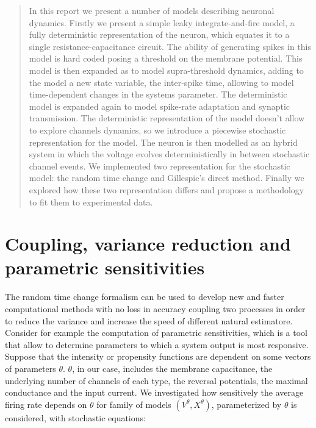\begin{abstract}
	In this report we present a number of models describing neuronal dynamics.
	Firstly we present a simple leaky integrate-and-fire model, a fully deterministic representation of the neuron, which equates it to a single resistance-capacitance circuit.
	The ability of generating spikes in this model is hard coded posing a threshold on the membrane potential.
	This model is then expanded as to model supra-threshold dynamics, adding to the model a new state variable, the inter-spike time, allowing to model time-dependent changes in the systems parameter.
	The deterministic model is expanded again to model spike-rate adaptation and synaptic transmission.
	The deterministic representation of the model doesn't allow to explore channels dynamics, so we introduce a piecewise stochastic representation for the model.
	The neuron is then modelled as an hybrid system in which the voltage evolves deterministically in between stochastic channel events.
	We implemented two representation for the stochastic model: the random time change and Gillespie's direct method.
	Finally we explored how these two representation differs and propose a methodology to fit them to experimental data.
\end{abstract}












\section{Coupling, variance reduction and parametric sensitivities}
The random time change formalism can be used to develop new and faster computational methods with no loss in accuracy coupling two processes in order to reduce the variance and increase the speed of different natural estimatore.
Consider for example the computation of parametric sensitivities, which is a tool that allow to determine parameters to which a system output is most responsive.
Suppose that the intensity or propensity functions are dependent on some vectors of parameters $\theta$.
$\theta$, in our case, includes the membrane capacitance, the underlying number of channels of each type, the reversal potentials, the maximal conductance and the input current. We investigated how sensitively the average firing rate depends on $\theta$ for family of models $(V^\theta, X^\theta)$, parameterized by $\theta$ is considered, with stochastic equations:

